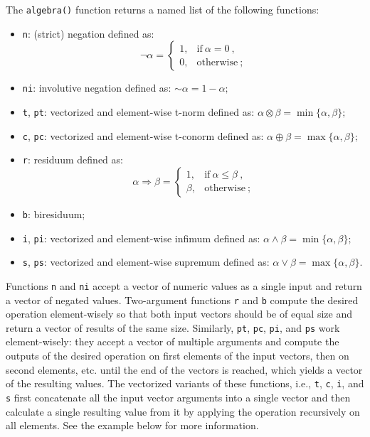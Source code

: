 \documentclass[review]{elsarticle}
\newcommand{\code}[1]{\texttt{#1}}
\begin{document}
The \code{algebra()} function returns a named list of the following functions:
\begin{itemize}
    \item \code{n}: (strict) negation defined as:
    $$
    \lnot\alpha = \begin{cases}
    1, & \text{if}\ \alpha = 0 \ , \\
    0, & \text{otherwise} \ ;
    \end{cases}
    $$
    \item \code{ni}: involutive negation defined as:
    ${\sim}\alpha = 1 - \alpha;$
    \item \code{t}, \code{pt}: vectorized and element-wise t-norm defined as:
    $\alpha \otimes \beta = \min\{\alpha, \beta\};$
    \item \code{c}, \code{pc}: vectorized and element-wise t-conorm defined as: $\alpha \oplus \beta = \max\{\alpha, \beta\};$
    \item \code{r}: residuum defined as:
    $$
    \alpha\Rightarrow\beta = \begin{cases}
    1, & \text{if}\ \alpha\le\beta \ , \\
    \beta, & \text{otherwise}\ ;
    \end{cases}
    $$
    \item \code{b}: biresiduum;
    \item \code{i}, \code{pi}: vectorized and element-wise infimum defined as:
    $\alpha \land \beta = \min\{\alpha, \beta\};$
    \item \code{s}, \code{ps}: vectorized and element-wise supremum defined as:
    $\alpha \lor \beta = \max\{\alpha, \beta\}.$
\end{itemize}

Functions \code{n} and \code{ni} accept a vector of numeric values as a single input and return a vector of negated values. Two-argument functions \code{r} and \code{b} compute the desired operation element-wisely so that both input vectors should be of equal size and return a vector of results of the same size. Similarly, \code{pt}, \code{pc}, \code{pi}, and \code{ps} work element-wisely: they accept a vector of multiple arguments and compute the outputs of the desired operation on first elements of the input vectors, then on second elements, etc. until the end of the vectors is reached, which yields a vector of the resulting values. The vectorized variants of these functions, i.e., \code{t}, \code{c}, \code{i}, and \code{s} first concatenate all the input vector arguments into a single vector and then calculate a single resulting value from it by applying the operation recursively on all elements. See the example below for more information.
%

%
\end{document}
